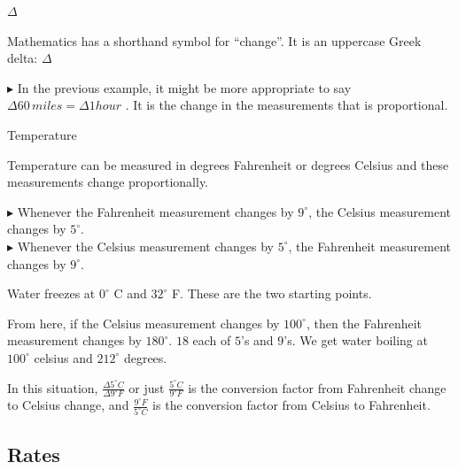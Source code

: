\documentclass{ximera}
\begin{document}
\begin{notation}  \textbf{\textcolor{red!50!green}{$\Delta$}} 


Mathematics has a shorthand symbol for ``change''.  It is an uppercase Greek delta: $\Delta$

\end{notation}

\textbf{\textcolor{purple!85!blue}{$\blacktriangleright$}}  In the previous example, it might be more appropriate to say \textbf{\textcolor{purple!85!blue}{$\Delta 60 \, miles = \Delta 1 hour$}} . It is the change in the measurements that is proportional.




\begin{example} Temperature


Temperature can be measured in degrees Fahrenheit or degrees Celsius and these measurements change proportionally. 


$\blacktriangleright$ Whenever the Fahrenheit measurement changes by $9^{\circ}$, the Celsius measurement changes by $5^{\circ}$. \\
$\blacktriangleright$ Whenever the Celsius measurement changes by $5^{\circ}$, the Fahrenheit measurement changes by $9^{\circ}$. 


Water freezes at $0^{\circ}$ C and $32^{\circ}$ F.  These are the two starting points.

From here, if the Celsius measurement changes by $100^{\circ}$, then the Fahrenheit measurement changes by $180^{\circ}$.  $18$ each of $5$'s and $9$'s. We get water boiling at $100^{\circ}$ celsius and $212^{\circ}$ degrees.


In this situation, $\frac{\Delta 5^{\circ}C}{\Delta 9^{\circ}F}$ or just $\frac{5^{\circ}C}{9^{\circ}F}$ is the conversion factor from Fahrenheit change to Celsius change, and $\frac{9^{\circ}F}{5^{\circ}C}$ is the conversion factor from Celsius to Fahrenheit.






\end{example} 
















\subsection*{Rates}
\end{document}
